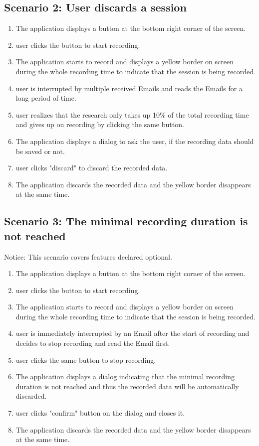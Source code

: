\subsection{Scenario 2: User discards a session}
\begin{enumerate}
    \item The application displays a button at the bottom right corner of the screen.
    \item \Gls{user} clicks the button to start recording.
    \item The application starts to record and displays a yellow border on screen during the whole recording time to indicate that the \gls{session} is being recorded.
    \item \Gls{user} is interrupted by multiple received Emails and reads the Emails for a long period of time.
    \item \Gls{user} realizes that the research only takes up 10\% of the total recording time and gives up on recording by clicking the same button.
    \item The application displays a dialog to ask the \gls{user}, if the recording data should be saved or not.
    \item \Gls{user} clicks "discard" to discard the recorded data.
    \item The application discards the recorded data and the yellow border disappears at the same time.
\end{enumerate}

\subsection{Scenario 3: The minimal recording duration is not reached}
Notice: This scenario covers features declared optional.
\begin{enumerate}
    \item The application displays a button  at the bottom right corner of the screen.
    \item \Gls{user} clicks the button to start recording.
    \item The application starts to record and displays a yellow border on screen during the whole recording time to indicate that the \gls{session} is being recorded.
    \item \Gls{user} is immediately interrupted by an Email after the start of recording and decides to stop recording and read the Email first.
    \item \Gls{user} clicks the same button to stop recording.
    \item The application displays a dialog indicating that the minimal recording duration \see[OC10] is not reached and thus the recorded data will be automatically discarded.
    \item \Gls{user} clicks "confirm" button on the dialog and closes it.
    \item The application discards the recorded data and the yellow border disappears at the same time.
    \end{enumerate}
    
